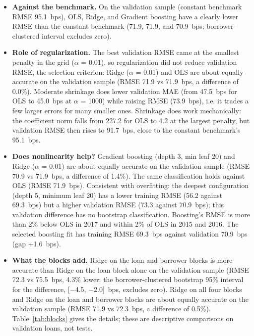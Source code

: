 \documentclass[9pt,letterpaper]{extarticle}
\begin{document}
\begin{itemize}
  \item \textbf{Against the benchmark.} On the validation sample (constant benchmark RMSE 95.1~bps), OLS, Ridge, and Gradient boosting have a clearly lower RMSE than the constant benchmark (71.9, 71.9, and 70.9~bps; borrower-clustered interval excludes zero).
  \item \textbf{Role of regularization.} The best validation RMSE came at the smallest penalty in the grid ($\alpha$ = 0.01), so regularization did not reduce validation RMSE, the selection criterion: Ridge ($\alpha$ = 0.01) and OLS are about equally accurate on the validation sample (RMSE 71.9 vs 71.9~bps, a difference of 0.0\%). Moderate shrinkage does lower validation MAE (from 47.5~bps for OLS to 45.0~bps at $\alpha$ = 1000) while raising RMSE (73.9~bps), i.e. it trades a few larger errors for many smaller ones. Shrinkage does work mechanically: the coefficient norm falls from 227.2 for OLS to 4.2 at the largest penalty, but validation RMSE then rises to 91.7~bps, close to the constant benchmark's 95.1~bps.
  \item \textbf{Does nonlinearity help?} Gradient boosting (depth 3, min leaf 20) and Ridge ($\alpha$ = 0.01) are about equally accurate on the validation sample (RMSE 70.9 vs 71.9~bps, a difference of 1.4\%). The same classification holds against OLS (RMSE 71.9~bps). Consistent with overfitting: the deepest configuration (depth 5, minimum leaf 20) has a lower training RMSE (56.2 against 69.3~bps) but a higher validation RMSE (73.3 against 70.9~bps); this validation difference has no bootstrap classification. Boosting's RMSE is more than 2\% below OLS in 2017 and within 2\% of OLS in 2015 and 2016. The selected boosting fit has training RMSE 69.3~bps against validation 70.9~bps (gap +1.6~bps).
  \item \textbf{What the blocks add.} Ridge on the loan and borrower blocks is more accurate than Ridge on the loan block alone on the validation sample (RMSE 72.3 vs 75.5~bps, 4.3\% lower; the borrower-clustered bootstrap 95\% interval for the difference, [$-$4.5, $-$2.0]~bps, excludes zero). Ridge on all four blocks and Ridge on the loan and borrower blocks are about equally accurate on the validation sample (RMSE 71.9 vs 72.3~bps, a difference of 0.5\%). Table~\ref{tab:blocks} gives the details; these are descriptive comparisons on validation loans, not tests.
\end{itemize}
\end{document}
